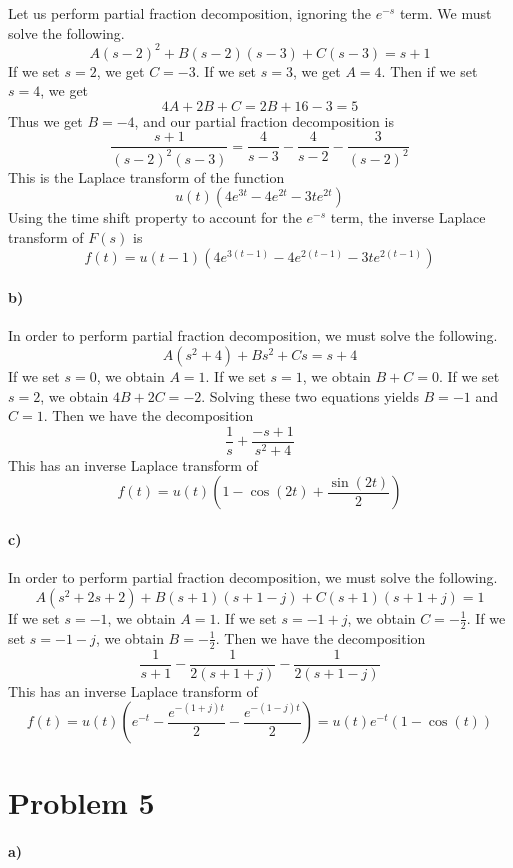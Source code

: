 \documentclass[12pt]{article}
\begin{document}
Let us perform partial fraction decomposition, ignoring the \(e^{-s}\) term. We must solve the following.
\[A(s-2)^2 + B(s-2)(s-3) + C(s-3) = s+1\]
If we set \(s=2\), we get \(C=-3\). If we set \(s=3\), we get \(A=4\). Then if we set \(s=4\), we get
\[4A+2B+C=2B+16-3=5\]
Thus we get \(B=-4\), and our partial fraction decomposition is
\[\frac{s+1}{(s-2)^2(s-3)}=\frac{4}{s-3}-\frac{4}{s-2}-\frac{3}{(s-2)^2}\]
This is the Laplace transform of the function
\[u(t)(4e^{3t}-4e^{2t}-3te^{2t})\]
Using the time shift property to account for the \(e^{-s}\) term, the inverse Laplace transform of \(F(s)\) is
\[f(t)=u(t-1)\left(4e^{3(t-1)}-4e^{2(t-1)}-3te^{2(t-1)}\right)\]

\paragraph{b)}

In order to perform partial fraction decomposition, we must solve the following.
\[A(s^2+4) + Bs^2 + Cs = s+4\]
If we set \(s=0\), we obtain \(A=1\). If we set \(s=1\), we obtain \(B+C=0\). If we set \(s=2\), we obtain \(4B+2C=-2\). Solving these two equations yields \(B=-1\) and \(C=1\). Then
we have the decomposition
\[\frac{1}{s}+\frac{-s+1}{s^2+4}\]
This has an inverse Laplace transform of
\[f(t)=u(t)\left(1-\cos(2t)+\frac{\sin(2t)}{2}\right)\]

\paragraph{c)}

In order to perform partial fraction decomposition, we must solve the following.
\[A(s^2+2s+2) + B(s+1)(s+1-j) + C(s+1)(s+1+j) = 1\]
If we set \(s=-1\), we obtain \(A=1\). If we set \(s=-1+j\), we obtain \(C=-\frac{1}{2}\). If we set \(s=-1-j\), we obtain \(B=-\frac{1}{2}\). Then we have the decomposition
\[\frac{1}{s+1}-\frac{1}{2(s+1+j)}-\frac{1}{2(s+1-j)}\]
This has an inverse Laplace transform of
\[f(t)=u(t)\left(e^{-t}-\frac{e^{-(1+j)t}}{2}-\frac{e^{-(1-j)t}}{2}\right)=u(t)e^{-t}(1-\cos(t))\]

\section*{Problem 5}

\paragraph{a)}
\end{document}

